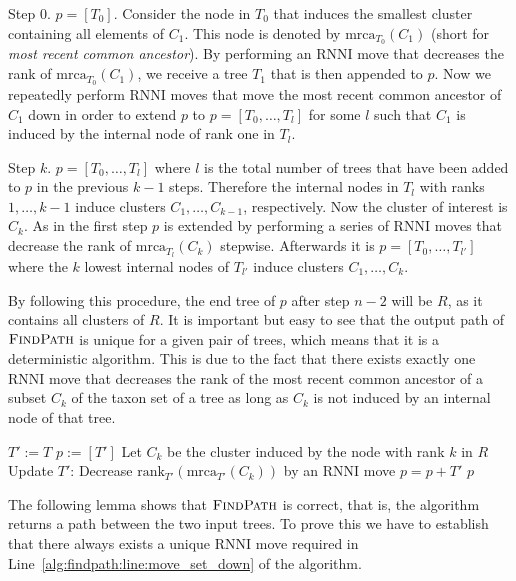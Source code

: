 \documentclass{amsart}
\newcommand{\mrca}{\mathrm{mrca}}
\newcommand{\rank}{\mathrm{rank}}
\newcommand{\rnni}{\mathrm{RNNI}}
\newcommand{\findpath}{\textsc{FindPath}}
\begin{document}
Step $0$.
$p = [T_0]$.
Consider the node in $T_0$ that induces the smallest cluster containing all elements of $C_1$.
This node is denoted by $\mrca_{T_0}(C_1)$ (short for \emph{most recent common ancestor}).
By performing an $\rnni$ move that decreases the rank of $\mrca_{T_0}(C_1)$, we receive a tree $T_1$ that is then appended to $p$.
Now we repeatedly perform $\rnni$ moves that move the most recent common ancestor of $C_1$ down in order to extend $p$ to $p = [T_0, \ldots, T_l]$ for some $l$ such that $C_1$ is induced by the internal node of rank one in $T_l$.

Step $k$.
$p = [T_0, \ldots, T_l]$ where $l$ is the total number of trees that have been added to $p$ in the previous $k-1$ steps.
Therefore the internal nodes in $T_l$ with ranks $1, \ldots, k-1$ induce clusters $C_1, \ldots, C_{k-1}$, respectively.
Now the cluster of interest is $C_k$.
As in the first step $p$ is extended by performing a series of $\rnni$ moves that decrease the rank of $\mrca_{T_l}(C_k)$ stepwise.
Afterwards it is $p = [T_0, \ldots, T_{l'}]$ where the $k$ lowest internal nodes of $T_{l'}$ induce clusters $C_1, \ldots, C_{k}$.

By following this procedure, the end tree of $p$ after step $n-2$ will be $R$, as it contains all clusters of $R$.
It is important but easy to see that the output path of $\findpath$ is unique for a given pair of trees, which means that it is a deterministic algorithm.
This is due to the fact that there exists exactly one $\rnni$ move that decreases the rank of the most recent common ancestor of a subset $C_k$ of the taxon set of a tree as long as $C_k$ is not induced by an internal node of that tree.

\begin{algorithm}[H]
\caption{$\findpath$($T,R$)}
\label{alg:find_path}
\begin{algorithmic}[1]
\STATE $T' := T$
\STATE $p := [T']$
\STATE Let $C_k$ be the cluster induced by the node with rank $k$ in $R$ \label{alg:find_path:line:cluster}
\WHILE {$\rank_{T'}(\mrca_{T'}(C_k))>k$}
\STATE Update $T'$: Decrease $\rank_{T'}(\mrca_{T'}(C_k))$ by an $\rnni$ move \label{alg:findpath:line:move_set_down}
\STATE $p = p+T'$
\ENDWHILE
\ENDFOR
\RETURN $p$
\end{algorithmic}
\end{algorithm}

The following lemma shows that $\findpath$ is correct, that is, the algorithm returns a path between the two input trees.
To prove this we have to establish that there always exists a unique $\rnni$ move required in Line~\ref{alg:findpath:line:move_set_down} of the algorithm.
\end{document}
